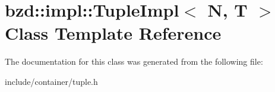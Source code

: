 \hypertarget{classbzd_1_1impl_1_1TupleImpl}{}\section{bzd\+:\+:impl\+:\+:Tuple\+Impl$<$ N, T $>$ Class Template Reference}
\label{classbzd_1_1impl_1_1TupleImpl}


The documentation for this class was generated from the following file\+:\begin{DoxyCompactItemize}
\item 
include/container/tuple.\+h\end{DoxyCompactItemize}
